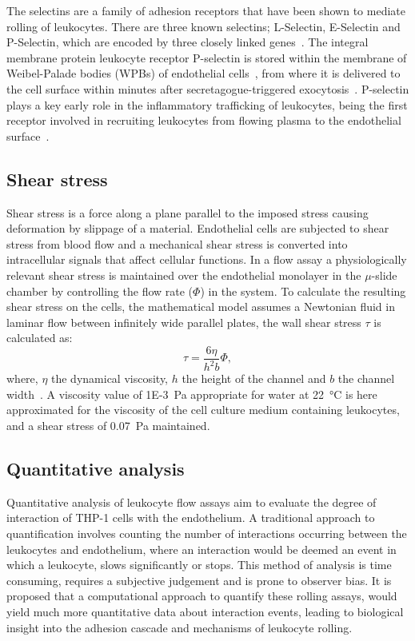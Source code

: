 The selectins are a family of adhesion receptors that have been shown to mediate rolling of leukocytes. There are three known selectins; L-Selectin, E-Selectin and P-Selectin, which are encoded by three closely linked genes~\cite{Watson1990}. The integral membrane protein leukocyte receptor P-selectin is stored within the membrane of Weibel-Palade bodies (WPBs) of endothelial cells~\cite{Bonfanti1989, McEver1989}, from where it is delivered to the cell surface within minutes after secretagogue-triggered exocytosis~\cite{McEver2002}. P-selectin plays a key early role in the inflammatory trafficking of leukocytes, being the first receptor involved in recruiting leukocytes from flowing plasma to the endothelial surface~\cite{Larsen1989}.

\subsection{Shear stress}
\label{leukocytes:introduction:shear}
Shear stress is a force along a plane parallel to the imposed stress causing deformation by slippage of a material. Endothelial cells are subjected to shear stress from blood flow and a mechanical shear stress is converted into intracellular signals that affect cellular functions. In a flow assay a physiologically relevant shear stress is maintained over the endothelial monolayer in the $\mu$-slide chamber by controlling the flow rate ($\Phi$) in the system. To calculate the resulting shear stress on the cells, the mathematical model assumes a Newtonian fluid in laminar flow between infinitely wide parallel plates, the wall shear stress $\tau$ is calculated as:
\begin{equation}
	\tau=\frac{6\eta}{h^2b}\Phi,
\end{equation}
where, $\eta$ the dynamical viscosity, $h$ the height of the channel and $b$ the channel width~\cite{Bacabac2005}. A viscosity value of \SI{1E-3}{Pa} appropriate for water at \SI{22}{\degreeCelsius} is here approximated for the viscosity of the cell culture medium containing leukocytes, and a shear stress of \SI{0.07}{\pascal} maintained.

\subsection{Quantitative analysis}
\label{leukocytes:introduction:quantitative}
Quantitative analysis of leukocyte flow assays aim to evaluate the degree of interaction of THP-1 cells with the endothelium. A traditional approach to quantification involves counting the number of interactions occurring between the leukocytes and endothelium, where an interaction would be deemed an event in which a leukocyte, slows significantly or stops. This method of analysis is time consuming, requires a subjective judgement and is prone to observer bias. It is proposed that a computational approach to quantify these rolling assays, would yield much more quantitative data about interaction events, leading to biological insight into the adhesion cascade and mechanisms of leukocyte rolling.

